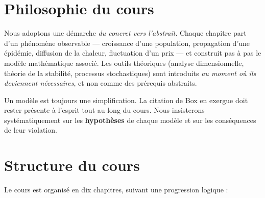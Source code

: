 \section*{Philosophie du cours}

Nous adoptons une d\'emarche \emph{du concret vers l'abstrait}. Chaque chapitre
part d'un ph\'enom\`ene observable --- croissance d'une population, propagation
d'une \'epid\'emie, diffusion de la chaleur, fluctuation d'un prix --- et
construit pas \`a pas le mod\`ele math\'ematique associ\'e.  Les outils th\'eoriques
(analyse dimensionnelle, th\'eorie de la stabilit\'e, processus stochastiques)
sont introduits \emph{au moment o\`u ils deviennent n\'ecessaires}, et non comme
des pr\'erequis abstraits.

\begin{attention}[title=\textbf{Mod\`ele $\neq$ R\'ealit\'e}]
Un mod\`ele est toujours une simplification.  La citation de Box en
exergue doit rester pr\'esente \`a l'esprit tout au long du cours.
Nous insisterons syst\'ematiquement sur les \textbf{hypoth\`eses} de chaque
mod\`ele et sur les cons\'equences de leur violation.
\end{attention}

\section*{Structure du cours}

Le cours est organis\'e en dix chapitres, suivant une progression logique :

